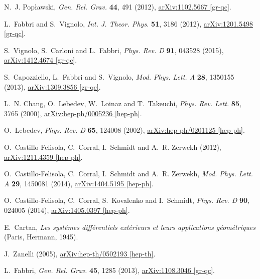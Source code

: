 \documentclass{ws-mpla}
\renewcommand{\(}{\left(}
\renewcommand{\)}{\right)}
\renewcommand{\[}{\left[}
\renewcommand{\]}{\right]}
\begin{document}
\begin{thebibliography}{10}
N.~J. Pop{\l}awski, {\em Gen. Rel. Grav.} {\bf 44}, 491  (2012),
  \href{http://arxiv.org/abs/1102.5667}{{\ttfamily arXiv:1102.5667 [gr-qc]}}.

L.~Fabbri and S.~Vignolo, {\em Int. J. Theor. Phys.} {\bf 51}, 3186  (2012),
  \href{http://arxiv.org/abs/1201.5498}{{\ttfamily arXiv:1201.5498 [gr-qc]}}.

S.~Vignolo, S.~Carloni and L.~Fabbri, {\em Phys. Rev. D} {\bf 91},   043528
  (2015), \href{http://arxiv.org/abs/1412.4674}{{\ttfamily arXiv:1412.4674
  [gr-qc]}}.

S.~Capozziello, L.~Fabbri and S.~Vignolo, {\em Mod. Phys. Lett. A} {\bf 28},
  1350155  (2013), \href{http://arxiv.org/abs/1309.3856}{{\ttfamily
  arXiv:1309.3856 [gr-qc]}}.

L.~N. Chang, O.~Lebedev, W.~Loinaz and T.~Takeuchi, {\em Phys. Rev. Lett.} {\bf
  85},   3765  (2000), \href{http://arxiv.org/abs/hep-ph/0005236}{{\ttfamily
  arXiv:hep-ph/0005236 [hep-ph]}}.

O.~Lebedev, {\em Phys. Rev. D} {\bf 65},   124008  (2002),
  \href{http://arxiv.org/abs/hep-ph/0201125}{{\ttfamily arXiv:hep-ph/0201125
  [hep-ph]}}.

O.~Castillo-Felisola, C.~Corral, I.~Schmidt and A.~R. Zerwekh  (2012),
  \href{http://arxiv.org/abs/1211.4359}{{\ttfamily arXiv:1211.4359 [hep-ph]}}.

O.~Castillo-Felisola, C.~Corral, I.~Schmidt and A.~R. Zerwekh, {\em Mod. Phys.
  Lett. A} {\bf 29},   1450081  (2014),
  \href{http://arxiv.org/abs/1404.5195}{{\ttfamily arXiv:1404.5195 [hep-ph]}}.

O.~Castillo-Felisola, C.~Corral, S.~Kovalenko and I.~Schmidt, {\em Phys. Rev.
  D} {\bf 90},   024005  (2014),
  \href{http://arxiv.org/abs/1405.0397}{{\ttfamily arXiv:1405.0397 [hep-ph]}}.

E.~Cartan, {\em Les syst{\'e}mes diff{\'e}rentiels ext{\'e}rieurs et leurs
  applications g{\'e}om{\'e}triques} (Paris, Hermann, 1945).

J.~Zanelli  (2005), \href{http://arxiv.org/abs/hep-th/0502193}{{\ttfamily
  arXiv:hep-th/0502193 [hep-th]}}.

L.~Fabbri, {\em Gen. Rel. Grav.} {\bf 45}, 1285  (2013),
  \href{http://arxiv.org/abs/1108.3046}{{\ttfamily arXiv:1108.3046 [gr-qc]}}.


\end{thebibliography}
\end{document}
